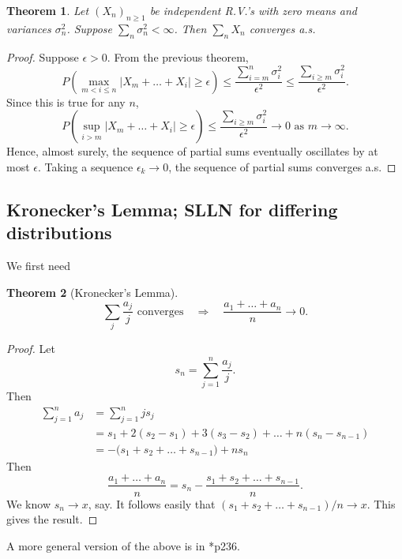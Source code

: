 \documentclass[a4paper]{amsart}
\theoremstyle{plain}
\newtheorem{theorem}{Theorem}[section]
\theoremstyle{definition}
\theoremstyle{remark}
\begin{document}
 \begin{theorem} \label{kmia} Let $ (X_n)_{n\geq 1}   $ be independent R.V.'s with zero means and variances $ \sigma _n^2 $.  Suppose $ \sum_n \sigma ^2_n < \infty $.  Then
 $   \sum_n X_n $ converges a.s.
 \end{theorem}

\begin{proof}
Suppose $ \epsilon > 0 $. From the previous theorem, 
\[
P \left( \max_{m< i \leq n} |X_m+\dots+ X_i | \geq \epsilon  \right) 
      \leq \frac { \sum_{i=m }^n \sigma _i^2 } { \epsilon ^2 }  \leq \frac { \sum_{i\geq m }  \sigma _i^2 } { \epsilon ^2 }      .%
\]
 Since this is true for any $ n $,
 \[
P \left( \sup_{  i >m} |X_m+\dots+ X_i | \geq \epsilon  \right) 
      \leq \frac { \sum_{i\geq m }  \sigma _i^2 } { \epsilon ^2 } \to 0 \text{ as } m \to \infty.
\]
Hence, almost surely, the sequence of partial sums  eventually oscillates by at most $ \epsilon $.  Taking a sequence $ \epsilon _k \to 0 $,  the sequence of partial sums converges a.s.
    \end{proof}  
 
 
\subsection{Kronecker's Lemma; SLLN for differing distributions}  
 
 We first need
 \begin{theorem}[Kronecker's Lemma] 
 \[
  \sum_j \frac{a_j}{j} \text{ converges} \quad  \Longrightarrow \quad  \frac{a_1 + \dots + a_n}{n} \to 0.
  \]
 \end{theorem}
 
 
\begin{proof}  Let
\[  
s_n = \sum_{j=1}^n \frac{a_j}{j}  . 
\] 
Then
\begin{align*} 
\sum_{j=1}^n a_j  &=  \sum_{j=1}^n j s_j\\
   &= s_1 + 2(s_2 - s_1 ) + 3(s_3 - s_2 )+ \dots + n(s_n - s_{n-1})\\
  & = -\big(s_1 +s_2+ \dots + s_{n-1} \big)+ n s_n
\end{align*} 
Then 
\[
 \frac{a_1 + \dots + a_n}{n} = s_n - \frac{ s_1 +s_2+ \dots + s_{n-1}  } {n}  .
\]
We know $ s_n \to x $, say.  It follows easily that $ (s_1 +s_2+ \dots + s_{n-1})/n \to x $. This gives the result.
\end{proof} 

A more general version of the above is in \cite{Ash}*{p236}.
\end{document}

